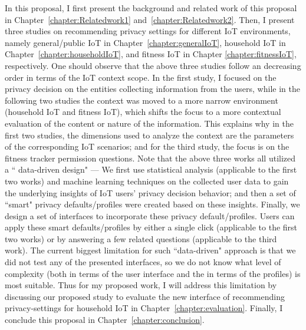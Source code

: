 In this proposal, I first present the background and related work of this proposal in Chapter~\ref{chapter:Relatedwork1} and~\ref{chapter:Relatedwork2}. Then, I present three studies on recommending privacy settings for different IoT environments, namely general/public IoT in Chapter~\ref{chapter:generalIoT}, household IoT in Chapter~\ref{chapter:householdIoT}, and fitness IoT in Chapter \ref{chapter:fitnessIoT}, respectively. One should observe that the above three studies follow an decreasing order in terms of the IoT context scope. In the first study, I focused on the privacy decision on the entities collecting information from the users, while in the following two studies the context was moved to a more narrow environment (household IoT and fitness IoT), which shifts the focus to a more contextual evaluation of the content or nature of the information. This explains why in the first two studies, the dimensions used to analyze the context are the parameters of the corresponding IoT scenarios; and for the third study, the focus is on the fitness tracker permission questions. Note that the above three works all utilized a `` data-driven design" --- We first use statistical analysis (applicable to the first two works) and machine learning techniques on the collected user data to gain the underlying insights of IoT users' privacy decision behavior; and then a set of ``smart" privacy defaults/profiles were created based on these insights. Finally, we design a set of interfaces to incorporate these privacy default/profiles. Users can apply these smart defaults/profiles by either a single click (applicable to the first two works) or by answering a few related questions (applicable to the third work). The current biggest limitation for such ``data-driven" approach is that we did not test any of the presented interfaces, so we do not know what level of complexity (both in terms of the user interface and the in terms of the profiles) is most suitable. Thus for my proposed work, I will address this limitation by discussing our proposed study to evaluate the new interface of recommending privacy-settings for household IoT in Chapter~\ref{chapter:evaluation}. Finally, I conclude this proposal in Chapter~\ref{chapter:conclusion}.


